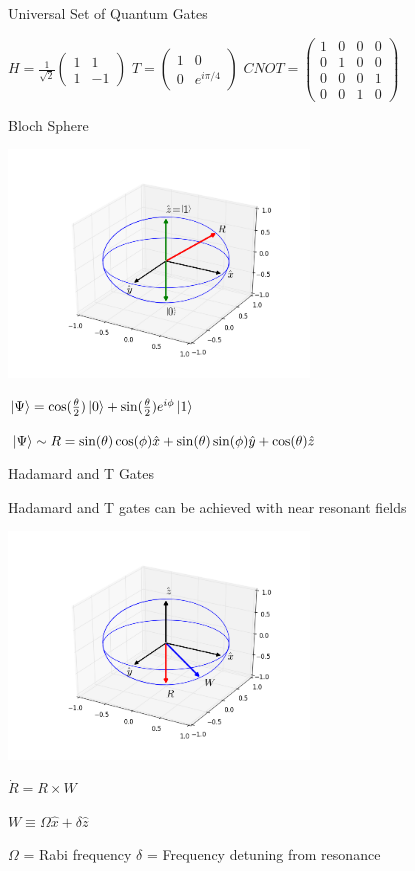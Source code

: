 \documentclass{beamer}
\begin{document}
\begin{frame}{Universal Set of Quantum Gates}
	\centerline{$
	H = \frac{1}{\sqrt{2}} \left(
		\begin{array}{cc} 1 & 1 \\ 1 & -1 \end{array}
	\right)$
	\hfill
	$T = \left(
		\begin{array}{cc} 1 & 0 \\ 0 & e^{i\pi/4} \end{array}
	\right)$
	\hfill
	$CNOT = \left(
		\begin{array}{cccc} 
			1 & 0 & 0 & 0 \\
			0 & 1 & 0 & 0 \\
			0 & 0 & 0 & 1 \\  
			0 & 0 & 1 & 0
		\end{array}
	\right)
	$}
\end{frame}

\begin{frame}{Bloch Sphere}
	\centerline{\includegraphics[width=0.6\textwidth]{Bloch_Sphere}}
	\vfill
\centerline{$\ket{\Psi} = \cos( \frac{\theta}{2} ) \ket{0} + \sin( \frac{\theta}{2} ) e^{i \phi} \ket{1}$}
\centerline{$\ket{\Psi} \sim R = \sin(\theta) \cos(\phi)\hat{x} + \sin(\theta) \sin(\phi)\hat{y} + \cos(\theta)\hat{z}$}
\end{frame}
	
\begin{frame}{Hadamard and T Gates}
	\centerline{Hadamard and T gates can be achieved with near resonant fields}
	\centerline{\includegraphics[width=0.6\textwidth]{Bloch_Sphere_W}}
	\centerline{$\dot{R} = R \times W$}
	\centerline{$W \equiv \Omega \hat{x} + \delta \hat{z}$}
\centerline{$\Omega$ = Rabi frequency \;\; $\delta$ = Frequency detuning from resonance}
\end{frame}
\end{document}
